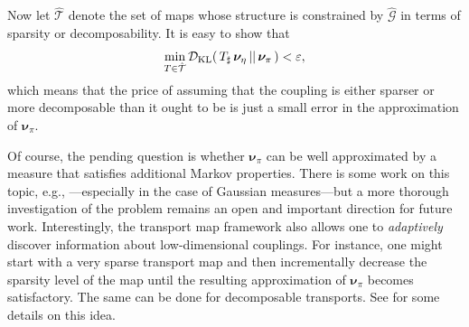 \documentclass[twoside,11pt]{article}
\newcommand{\push}{_\sharp}                                      %
\newcommand{\genm}{\boldsymbol{\nu} }   %
\newcommand{\agengr}{\hat{\Gcb}}    %
\newcommand{\Gcb}{\boldsymbol{\mathcal{G}}}
\newcommand{\Dkl}{\mathcal{D}_{\rm KL}}         %
\newcommand{\spaceMap}{\mathcal{T}}             %
\begin{document}
Now let $\hat{\spaceMap}$ denote the set of maps
whose structure is constrained by $\agengr$ in terms of
sparsity or decomposability.
%
It is easy to show that
%
\begin{equation}
  \min_{T \in \hat{\spaceMap}}  
  \Dkl(\,T\push\,\genm_\eta \, \vert\vert \, \genm_\pi \,) < \varepsilon,
\end{equation}
which 
means %
that the price %
of assuming 
that the coupling is either sparser or more
decomposable than it ought to be
is just a small
error in the approximation of $\genm_\pi$.

Of course, the pending 
%
question is  whether
$\genm_\pi$ can be well approximated  by a measure
that satisfies additional Markov properties.
%
There is some work on this topic, 
e.g., \citealp{johnson2008recursive,jog2015model,cheng2015efficient}---especially in the
case of Gaussian measures---but a more thorough 
investigation of the problem remains an open and
important direction for future work.
%
Interestingly, the transport map framework also
allows one to \textit{adaptively}
discover information about low-dimensional
couplings. %
For instance, one might start with a very sparse transport map %
and then incrementally decrease the sparsity level of the map
until the resulting approximation of $\genm_\pi$ becomes
satisfactory. The same can be done for decomposable transports.
See \citet{bigoni2016monotone} for some details on this idea.
\end{document}
